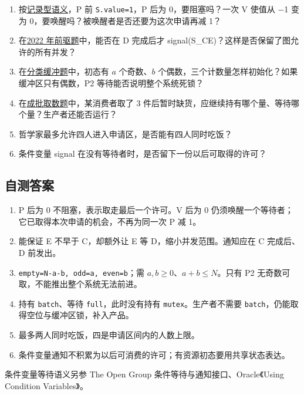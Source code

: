 \begin{enumerate}
\def\labelenumi{\arabic{enumi}.}
\tightlist
\item
  按\hyperref[sec-semaphore]{记录型语义}，P 前 \allowbreak{}\texttt{S.value=1}，P 后为 0，要阻塞吗？一次 V 使值从 −1 变为 0，要唤醒吗？被唤醒者是否还要为这次申请再减 1？
\item
  在\hyperref[ex-2022]{2022 年前驱题}中，能否在 D 完成后才 signal(S\_CE)？这样是否保留了图允许的所有并发？
\item
  在\hyperref[ex-2009]{分类缓冲题}中，初态有 \(a\) 个奇数、\(b\) 个偶数，三个计数量怎样初始化？如果缓冲区只有偶数，P2 等待能否说明整个系统死锁？
\item
  在\hyperref[ex-2014]{成批取数题}中，某消费者取了 3 件后暂时缺货，应继续持有哪个量、等待哪个量？生产者还能否运行？
\item
  哲学家最多允许四人进入申请区，是否能有四人同时吃饭？
\item
  条件变量 signal 在没有等待者时，是否留下一份以后可取得的许可？
\end{enumerate}

\subsection{自测答案}\label{os-c03-h568}

\begin{enumerate}
\def\labelenumi{\arabic{enumi}.}
\tightlist
\item
  P 后为 0 不阻塞，表示取走最后一个许可。V 后为 0 仍须唤醒一个等待者；它已取得本次申请的机会，不再为同一次 P 减 1。
\item
  能保证 E 不早于 C，却额外让 E 等 D，缩小并发范围。通知应在 C 完成后、D 前发出。
\item
  \allowbreak{}\texttt{empty=N-a-b,}\allowbreak{}\texttt{\ odd=a,}\allowbreak{}\texttt{\ even=b}；需 \(a,b\ge0\)、\(a+b\le N\)。只有 P2 无奇数可取，不能推出整个系统无法前进。
\item
  持有 \allowbreak{}\texttt{batch}、等待 \allowbreak{}\texttt{full}，此时没有持有 \allowbreak{}\texttt{mutex}。生产者不需要 \allowbreak{}\texttt{batch}，仍能取得空位与缓冲区锁，补入产品。
\item
  最多两人同时吃饭，四是申请区间内的人数上限。
\item
  条件变量通知不积累为以后可消费的许可；有资源初态要用共享状态表达。
\end{enumerate}

条件变量等待语义另参 The Open Group 条件等待与通知接口、Oracle《Using Condition Variables》。

